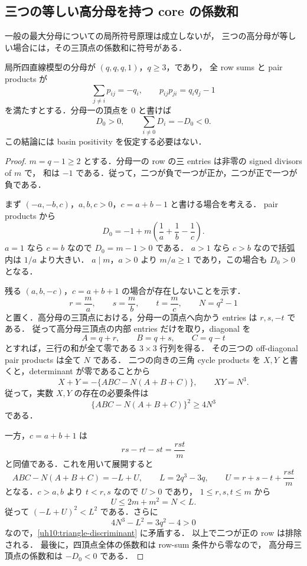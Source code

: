 
\subsection{三つの等しい高分母を持つ core の係数和}
\label{uh10:three-section}

一般の最大分母についての局所符号原理は成立しないが，
三つの高分母が等しい場合には，その三頂点の係数和に符号がある．

\begin{proposition}[三つの等高分母の負の総和]\label{uh10:three-negative}
局所四直線模型の分母が $(q,q,q,1)$，$q\geq3$，であり，
全 row sums と pair products が
\[
 \sum_{j\ne i}p_{ij}=-q_i,
 \qquad p_{ij}p_{ji}=q_iq_j-1
\]
を満たすとする．分母一の頂点を $0$ と書けば
\[
 D_0>0,\qquad \sum_{i\ne0}D_i=-D_0<0.
\]
この結論には basin positivity を仮定する必要はない．
\end{proposition}

\begin{proof}
$m=q-1\geq2$ とする．分母一の row の三 entries は非零の signed divisors of $m$ で，
和は $-1$ である．従って，二つが負で一つが正か，二つが正で一つが負である．

まず $(-a,-b,c)$，$a,b,c>0$，$c=a+b-1$ と書ける場合を考える．
pair products から
\[
 D_0=-1+m\left(\frac1a+\frac1b-\frac1c\right).
\]
$a=1$ なら $c=b$ なので $D_0=m-1>0$ である．
$a>1$ なら $c>b$ なので括弧内は $1/a$ より大きい．
$a\mid m$，$a>0$ より $m/a\geq1$ であり，この場合も $D_0>0$ となる．

残る $(a,b,-c)$，$c=a+b+1$ の場合が存在しないことを示す．
\[
 r=\frac ma,\qquad s=\frac mb,\qquad t=\frac mc,
 \qquad N=q^2-1
\]
と置く．高分母の三頂点における，分母一の頂点へ向かう entries は $r,s,-t$ である．
従って高分母三頂点の内部 entries だけを取り，diagonal を
\[
 A=q+r,\qquad B=q+s,\qquad C=q-t
\]
とすれば，三行の和が全て零である $3\times3$ 行列を得る．
その三つの off-diagonal pair products は全て $N$ である．
二つの向きの三角 cycle products を $X,Y$ と書くと，determinant が零であることから
\[
 X+Y=-\{ABC-N(A+B+C)\},
 \qquad XY=N^3.
\]
従って，実数 $X,Y$ の存在の必要条件は
\begin{equation}\label{uh10:triangle-discriminant}
 \{ABC-N(A+B+C)\}^2\geq4N^3
\end{equation}
である．

一方，$c=a+b+1$ は
\[
 rs-rt-st=\frac{rst}{m}
\]
と同値である．これを用いて展開すると
\[
 ABC-N(A+B+C)=-L+U,
 \qquad L=2q^3-3q,
 \qquad U=r+s-t+\frac{rst}{m}
\]
となる．$c>a,b$ より $t<r,s$ なので $U>0$ であり，
$1\leq r,s,t\leq m$ から
\[
 U\leq2m+m^2=N<L.
\]
従って $(-L+U)^2<L^2$ である．さらに
\[
 4N^3-L^2=3q^2-4>0
\]
なので，\eqref{uh10:triangle-discriminant} に矛盾する．
以上で二つが正の row は排除される．
最後に，四頂点全体の係数和は row-sum 条件から零なので，
高分母三頂点の係数和は $-D_0<0$ である．
\end{proof}
